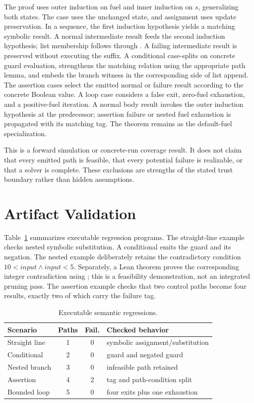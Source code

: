 \documentclass[10pt,twocolumn]{article}
\newcommand{\code}[1]{\texttt{\detokenize{#1}}}
\begin{document}
The proof uses outer induction on fuel and inner induction on $s$, generalizing
both states.  The \code{skip} case
uses the unchanged state, and assignment uses update preservation.  In a
sequence, the first induction hypothesis yields a matching symbolic result.  A
normal intermediate result feeds the second induction hypothesis; list
membership follows through \code{flatMap}.  A failing intermediate result is
preserved without executing the suffix.  A conditional case-splits on concrete
guard evaluation, strengthens the matching relation using the appropriate path
lemma, and embeds the branch witness in the corresponding side of list append.
The assertion cases select the emitted normal or failure result according to the
concrete Boolean value.  A loop case considers a false exit, zero-fuel
exhaustion, and a positive-fuel iteration.  A normal body result invokes the
outer induction hypothesis at the predecessor; assertion failure or nested fuel
exhaustion is propagated with its matching tag.  The theorem
\code{symExec_sound} remains as the default-fuel specialization.

This is a forward simulation or concrete-run coverage result.  It does not claim
that every emitted path is feasible, that every potential failure is realizable,
or that a solver is complete.  These exclusions are strengths of the stated
trust boundary rather than hidden assumptions.

\section{Artifact Validation}

Table~\ref{tab:examples} summarizes executable regression programs.  The
straight-line example checks nested symbolic substitution.  A conditional emits
the guard and its negation.  The nested example deliberately retains the
contradictory condition $10<\mathit{input}\land\mathit{input}<5$.  Separately, a
Lean theorem proves the corresponding integer contradiction using \code{omega};
this is a feasibility demonstration, not an integrated pruning pass.  The
assertion example checks that two control paths become four results, exactly two
of which carry the failure tag.

\begin{table}[t]
\centering
\small
\caption{Executable semantic regressions.}
\label{tab:examples}
\begin{tabular}{@{}lccp{2.9cm}@{}}
\toprule
Scenario & Paths & Fail. & Checked behavior\\
\midrule
Straight line & 1 & 0 & symbolic assignment/substitution\\
Conditional & 2 & 0 & guard and negated guard\\
Nested branch & 3 & 0 & infeasible path retained\\
Assertion & 4 & 2 & tag and path-condition split\\
Bounded loop & 5 & 0 & four exits plus one exhaustion\\
\bottomrule
\end{tabular}
\end{table}
\end{document}
